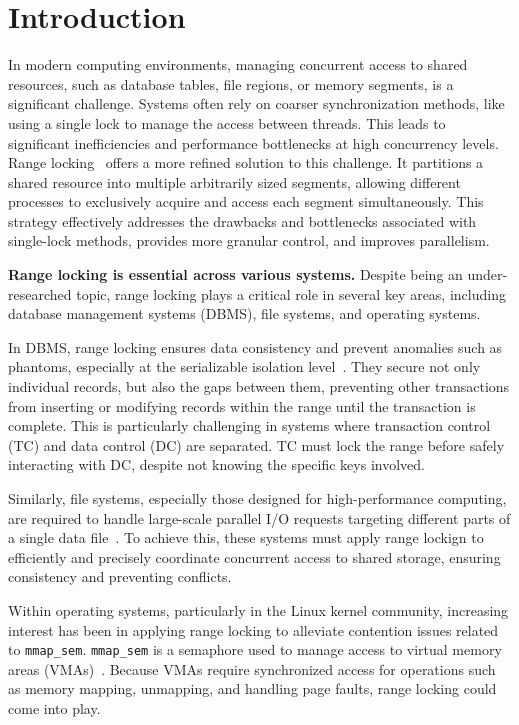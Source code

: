 \chapter{Introduction}\label{chapter:introduction}

In modern computing environments, managing concurrent access to shared resources, such as database tables, file regions, or memory segments, is a significant challenge.
Systems often rely on coarser synchronization methods, like using a single lock to manage the access between threads. 
This leads to significant inefficiencies and performance bottlenecks at high concurrency levels. 
Range locking~\parencite{gao2023citron, kogan2020scalable, song2013parallelizing} offers a more refined solution to this challenge. 
It partitions a shared resource into multiple arbitrarily sized segments, allowing different processes to exclusively acquire and access each segment simultaneously.
This strategy effectively addresses the drawbacks and bottlenecks associated with single-lock methods, provides more granular control, and improves parallelism.

\textbf{Range locking is essential across various systems.}  
Despite being an under-researched topic, range locking plays a critical role in several key areas, including database management systems (DBMS), file systems, and operating systems.

In DBMS, range locking ensures data consistency and prevent anomalies such as phantoms, especially at the serializable isolation level~\parencite{lomet2009locking}. 
They secure not only individual records, but also the gaps between them, preventing other transactions from inserting or modifying records within the range until the transaction is complete. 
This is particularly challenging in systems where transaction control (TC) and data control (DC) are separated. 
TC must lock the range before safely interacting with DC, despite not knowing the specific keys involved.

Similarly, file systems, especially those designed for high-performance computing, are required to handle large-scale parallel I/O requests targeting different parts of a single data file~\parencite{congiu2016improving, kang2021optimizing}. 
To achieve this, these systems must apply range lockign to efficiently and precisely coordinate concurrent access to shared storage, ensuring consistency and preventing conflicts.

Within operating systems, particularly in the Linux kernel community, increasing interest has been in applying range locking to alleviate contention issues related to \texttt{mmap\_sem}. 
\texttt{mmap\_sem} is a semaphore used to manage access to virtual memory areas (VMAs)~\parencite{readerWriterLocks2017, mapleTree2021, mmapLock2022}. 
Because VMAs require synchronized access for operations such as memory mapping, unmapping, and handling page faults, range locking could come into play.

